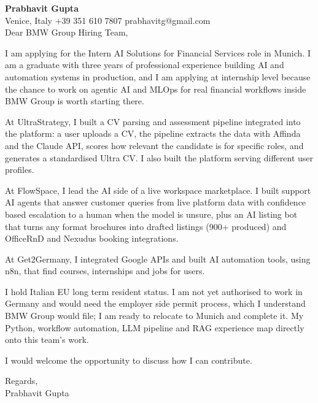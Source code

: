\documentclass[a4paper,10.5pt]{article}
\begin{document}
\textbf{Prabhavit Gupta}\\
Venice, Italy \textbar{} +39 351 610 7807 \textbar{} prabhavitg@gmail.com\\[10pt]
Dear BMW Group Hiring Team,

I am applying for the Intern AI Solutions for Financial Services role in Munich. I am a graduate with three years of professional experience building AI and automation systems in production, and I am applying at internship level because the chance to work on agentic AI and MLOps for real financial workflows inside BMW Group is worth starting there.

At UltraStrategy, I built a CV parsing and assessment pipeline integrated into the platform: a user uploads a CV, the pipeline extracts the data with Affinda and the Claude API, scores how relevant the candidate is for specific roles, and generates a standardised Ultra CV. I also built the platform serving different user profiles.

At FlowSpace, I lead the AI side of a live workspace marketplace. I built support AI agents that answer customer queries from live platform data with confidence based escalation to a human when the model is unsure, plus an AI listing bot that turns any format brochures into drafted listings (900+ produced) and OfficeRnD and Nexudus booking integrations.

At Get2Germany, I integrated Google APIs and built AI automation tools, using n8n, that find courses, internships and jobs for users.

I hold Italian EU long term resident status. I am not yet authorised to work in Germany and would need the employer side permit process, which I understand BMW Group would file; I am ready to relocate to Munich and complete it. My Python, workflow automation, LLM pipeline and RAG experience map directly onto this team's work.

I would welcome the opportunity to discuss how I can contribute.

Regards,\\
Prabhavit Gupta
\end{document}
